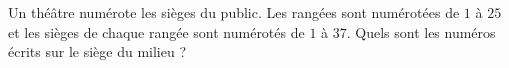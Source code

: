
\begin{exercice}\label{exosmath-0624}

    Un théâtre numérote les sièges du public. Les rangées sont numérotées de \( 1\) à \( 25\) et les sièges de chaque rangée sont numérotés de \( 1\) à \( 37\). Quels sont les numéros écrits sur le siège du milieu ?

\end{exercice}
